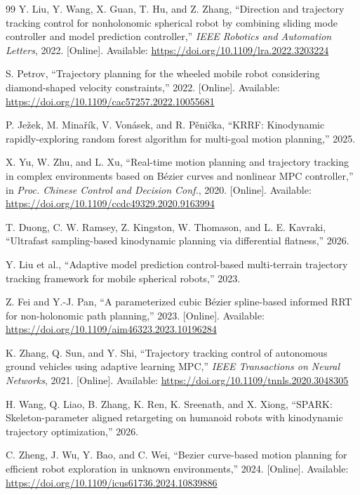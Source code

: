 \begin{thebibliography}{99}
Y. Liu, Y. Wang, X. Guan, T. Hu, and Z. Zhang, ``Direction and trajectory tracking control for nonholonomic spherical robot by combining sliding mode controller and model prediction controller,'' \emph{IEEE Robotics and Automation Letters}, 2022. [Online]. Available: \url{https://doi.org/10.1109/lra.2022.3203224}

S. Petrov, ``Trajectory planning for the wheeled mobile robot considering diamond-shaped velocity constraints,'' 2022. [Online]. Available: \url{https://doi.org/10.1109/cac57257.2022.10055681}

P. Ježek, M. Minařík, V. Vonásek, and R. Pěnička, ``KRRF: Kinodynamic rapidly-exploring random forest algorithm for multi-goal motion planning,'' 2025.

X. Yu, W. Zhu, and L. Xu, ``Real-time motion planning and trajectory tracking in complex environments based on Bézier curves and nonlinear MPC controller,'' in \emph{Proc. Chinese Control and Decision Conf.}, 2020. [Online]. Available: \url{https://doi.org/10.1109/ccdc49329.2020.9163994}

T. Duong, C. W. Ramsey, Z. Kingston, W. Thomason, and L. E. Kavraki, ``Ultrafast sampling-based kinodynamic planning via differential flatness,'' 2026.

Y. Liu et al., ``Adaptive model prediction control-based multi-terrain trajectory tracking framework for mobile spherical robots,'' 2023.

Z. Fei and Y.-J. Pan, ``A parameterized cubic Bézier spline-based informed RRT for non-holonomic path planning,'' 2023. [Online]. Available: \url{https://doi.org/10.1109/aim46323.2023.10196284}

K. Zhang, Q. Sun, and Y. Shi, ``Trajectory tracking control of autonomous ground vehicles using adaptive learning MPC,'' \emph{IEEE Transactions on Neural Networks}, 2021. [Online]. Available: \url{https://doi.org/10.1109/tnnls.2020.3048305}

H. Wang, Q. Liao, B. Zhang, K. Ren, K. Sreenath, and X. Xiong, ``SPARK: Skeleton-parameter aligned retargeting on humanoid robots with kinodynamic trajectory optimization,'' 2026.

C. Zheng, J. Wu, Y. Bao, and C. Wei, ``Bezier curve-based motion planning for efficient robot exploration in unknown environments,'' 2024. [Online]. Available: \url{https://doi.org/10.1109/icus61736.2024.10839886}


\end{thebibliography}
